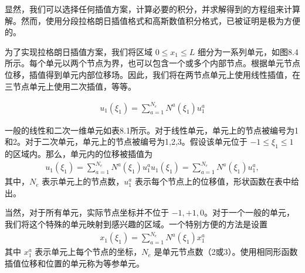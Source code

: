 \documentclass[12pt,a4paper]{book}
\begin{document}
显然，我们可以选择任何插值方案，计算必要的积分，并求解得到的方程组来计算解。然而，使用分段拉格朗日插值格式和高斯数值积分格式，已被证明是极为方便的。







为了实现拉格朗日插值方案，我们将区域 $ 0 \leq  x_1 \leq L $ 细分为一系列单元，如图8.4所示。每个单元以两个节点为界，也可以包含一个或多个内部节点。根据单元节点位移，插值得到单元内部位移场。因此，我们将在两节点单元上使用线性插值，在三节点单元上使用二次插值，等等。

\begin{equation*}
    \begin{aligned}
        u_{1}\left(\xi_{1}\right)=\sum_{a=1}^{N_{e}} N^{a}\left(\xi_{1}\right) u_{1}^{a}
    \end{aligned}
\end{equation*}


一般的线性和二次一维单元如表8.1所示。对于线性单元，单元上的节点被编号为1和2。对于二次单元，单元上的节点被编号为1,2,3。假设该单元位于 $-1 \leq \xi_1 \leq 1$ 的区域内。那么，单元内的位移被插值为
\begin{equation*}
    \begin{aligned}
        u_{1}\left(\xi_{1}\right)=\sum_{a=1}^{N_{e}} N^{a}\left(\xi_{1}\right) u_{1}^{a}u_{1}\left(\xi_{1}\right)=\sum_{a=1}^{N_{e}} N^{a}\left(\xi_{1}\right) u_{1}^{a},
    \end{aligned}
\end{equation*}
其中，$N_e$ 表示单元上的节点数，$u_1^a$ 表示每个节点上的位移值，形状函数在表中给出。


当然，对于所有单元，实际节点坐标并不位于 $-1, +1, 0$。对于一个一般的单元，我们将这个特殊的单元映射到感兴趣的区域。一个特别方便的方法是设置
\begin{equation*}
    \begin{aligned}
        x_{1}\left(\xi_{1}\right)=\sum_{a=1}^{N_{e}} N^{a}\left(\xi_{1}\right) x_{1}^{a}
    \end{aligned}
\end{equation*}
其中 $x_1^a$ 表示单元上每个节点的坐标，$N_e$ 是单元节点数（2或3）。使用相同形函数插值位移和位置的单元称为等参单元。


% 







\end{document}
